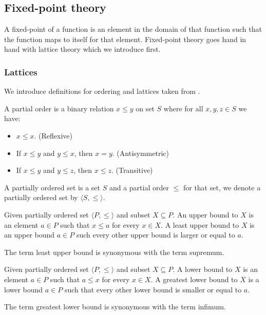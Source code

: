 \subsection{Fixed-point theory} 
A fixed-point of a function is an element in the domain of that function such that the function maps to itself for that element. Fixed-point theory goes hand in hand with lattice theory which we introduce first.
\subsubsection{Lattices}
We introduce definitions for ordering and lattices taken from \cite{birkhoff1940lattice}.
\begin{definition}
	A partial order is a binary relation $x \leq y$ on set $S$ where for all $x,y,z \in S$ we have:
	\begin{itemize}
		\item $x \leq x$. (Reflexive)
		\item If $x \leq y$ and $y \leq x$, then $x=y$. (Antisymmetric)
		\item If $x \leq y$ and $y \leq z$, then $x \leq z$. (Transitive)
	\end{itemize}
\end{definition}

\begin{definition}
	A partially ordered set is a set $S$ and a partial order $\leq$ for that set, we denote a partially ordered set by $\langle S, \leq \rangle$.
\end{definition}

\begin{definition}
	Given partially ordered set $\langle P,\leq \rangle$ and subset $X \subseteq P$. An upper bound to $X$ is an element $a \in P$ such that $x \leq a$ for every $x\in X$. A least upper bound to $X$ is an upper bound $a \in P$ such every other upper bound is larger or equal to $a$.
	
	The term least upper bound is synonymous with the term supremum.
\end{definition}
\begin{definition}
	Given partially ordered set $\langle P,\leq \rangle$ and subset $X \subseteq P$. A lower bound to $X$ is an element $a \in P$ such that $a \leq x$ for every $x\in X$. A greatest lower bound to $X$ is a lower bound $a \in P$ such that every other lower bound is smaller or equal to $a$.
	
	The term greatest lower bound is synonymous with the term infimum.
\end{definition}

